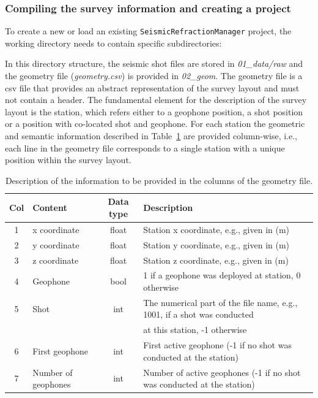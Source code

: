 \documentclass[a4paper,fleqn]{cas-sc}
\begin{document}
\subsubsection{Compiling the survey information and creating a project}

To create a new or load an existing \texttt{SeismicRefractionManager} project, the working directory needs to contain specific subdirectories:

In this directory structure, the seismic shot files are stored in \textit{01\_data/raw} and the geometry file (\textit{geometry.csv}) is provided in \textit{02\_geom}.
The geometry file is a csv file that provides an abstract representation of the survey layout and must not contain a header. The fundamental element for the description of the survey layout is the station, which refers either to a geophone position, a shot position or a position with co-located shot and geophone. For each station the geometric and semantic information described in Table~\ref{tab:geometry} are provided column-wise, i.e., each line in the geometry file corresponds to a single station with a unique position within the survey layout. 
\begin{table}[pos=h]
    \caption{Description of the information to be provided in the columns of the geometry file.}
    \centering
    \begin{tabular}{clcl}
        \toprule
        \textbf{Col} & \textbf{Content} & \textbf{Data type} & \textbf{Description} \\
        \midrule
        1 & x coordinate & float & Station x coordinate, e.g., given in (m) \\ 
        2 & y coordinate & float & Station y coordinate, e.g., given in (m) \\ 
        3 & z coordinate & float & Station z coordinate, e.g., given in (m) \\ 
        4 & Geophone & bool & 1 if a geophone was deployed at station, 0 otherwise \\ 
        5 & Shot & int & The numerical part of the file name, e.g., 1001, if a shot was conducted \\
          & & & at this station, -1 otherwise \\ 
        6 & First geophone & int & First active geophone (-1 if no shot was conducted at the station) \\ 
        7 & Number of geophones & int & Number of active geophones (-1 if no shot was conducted at the station) \\
        \bottomrule
    \end{tabular}
    \label{tab:geometry}
\end{table}
\end{document}
